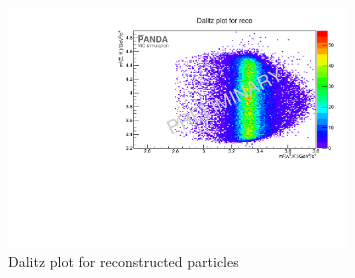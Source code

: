 	\begin{figure}
		\centering
		\includegraphics[width=0.8\textwidth]{./plots/pbarp/Dalitzplot_reco.pdf}
		\caption{\propose Dalitz plot for reconstructed particles}
		\label{fig:reco_Dalitzplot}
	
	\end{figure}
	
	